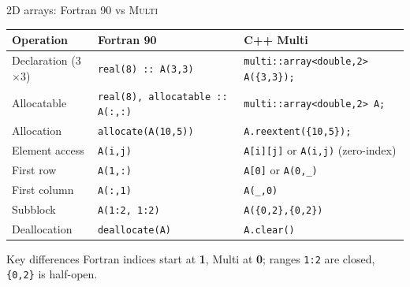 \documentclass[t,aspectratio=169,handout]{beamer}
\begin{document}
\begin{frame}[label=fortran-comparison,fragile]{2D arrays: Fortran 90 vs \textsc{Multi}}
\small
\begin{tabular}{@{}lll@{}}
\hline
\textbf{Operation}         & \textbf{Fortran 90}                  & \textbf{C++ Multi} \\
\hline
Declaration (3$\times$3)   & \lstinline|real(8) :: A(3,3)|        & \lstinline|multi::array<double,2> A({3,3});| \\
Allocatable                & \lstinline|real(8), allocatable :: A(:,:)| & \lstinline|multi::array<double,2> A;| \\
Allocation                 & \lstinline|allocate(A(10,5))|        & \lstinline|A.reextent({10,5});| \\
Element access             & \lstinline|A(i,j)|                   & \lstinline|A[i][j]| or \lstinline|A(i,j)| (zero-index)\\
First row                  & \lstinline|A(1,:)|                   & \lstinline|A[0]| or \lstinline|A(0,_)| \\
First column               & \lstinline|A(:,1)|                   & \lstinline|A(_,0)| \\
Subblock                   & \lstinline|A(1:2, 1:2)|              & \lstinline|A({0,2},{0,2})| \\
Deallocation               & \lstinline|deallocate(A)|            & \lstinline|A.clear()| \\
\hline
\end{tabular}

\vspace{0.5em}
\begin{alertblock}{Key differences}
  Fortran indices start at \textbf{1}, Multi at \textbf{0}; ranges \lstinline|1:2| are closed, \lstinline|{0,2}| is half-open.
\end{alertblock}
\end{frame}
\end{document}
